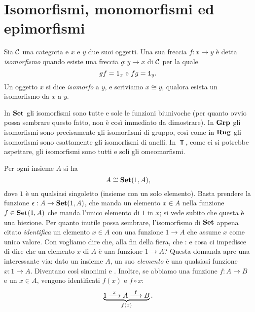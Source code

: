 
\section{Isomorfismi, monomorfismi ed epimorfismi}

\begin{definizione}
Sia \(\mathcal C\) una categoria e \(x\) e \(y\) due suoi oggetti. Una sua freccia \(f : x \to y\) è detta {\em isomorfismo} quando esiste una freccia \(g : y \to x\) di \(\mathcal C\) per la quale
\[gf = \mathtt{1}_x \text{ e } fg = \mathtt{1}_y .\]
Un oggetto \(x\) si dice {\em isomorfo} a \(y\), e scriviamo \(x \cong y\), qualora esista un isomorfismo da \(x\) a \(y\).
\end{definizione}

\begin{esempio}
In \(\mathbf{Set}\) gli isomorfismi sono tutte e sole le funzioni biunivoche (per quanto ovvio possa sembrare questo fatto, non è così immediato da dimostrare). In \(\mathbf{Grp}\) gli isomorfismi sono precisamente gli isomorfismi di gruppo, così come in \(\mathbf{Rng}\) gli isomorfismi sono esattamente gli isomorfismi di anelli. In \(\Top\), come ci si potrebbe aspettare, gli isomorfismi sono tutti e soli gli omeomorfismi.
\end{esempio}

\begin{esempio}\label{esempio:ElemAsFunc}
Per ogni insieme \(A\) si ha
\[A \cong \mathbf{Set}(1, A) ,\]
dove \(1\) è un qualsiasi singoletto (insieme con un solo elemento). Basta prendere la funzione \(\epsilon : A \to \mathbf{Set}(1, A)\), che manda un elemento \(x \in A\) nella funzione \(f \in \mathbf{Set}(1, A)\) che manda l'unico elemento di \(1\) in \(x\); si vede subito che questa è una biezione.\newline
Per quanto inutile possa sembrare, l'isomorfismo di \(\mathbf{Set}\) appena citato {\em identifica} un elemento \(x \in A\) con una funzione \(1 \to A\) che assume \(x\) come unico valore. Con  vogliamo dire che, alla fin della fiera, che : e cosa ci impedisce di dire che un elemento \(x\) di \(A\) è una funzione \(1 \to A\)?\newline
Questa domanda apre una interessante via: dato un insieme \(A\), un suo {\em elemento} è una qualsiasi funzione \(x : 1 \to A\). Diventano così sinonimi  e . Inoltre, se abbiamo una funzione \(f : A \to B\) e un \(x \in A\), vengono identificati \(f(x)\) e \(f \circ x\):
\[\underbrace{1 \xrightarrow{\ x\ } A \xrightarrow{\ f\ } B}_{f(x)} .\]
\end{esempio}

